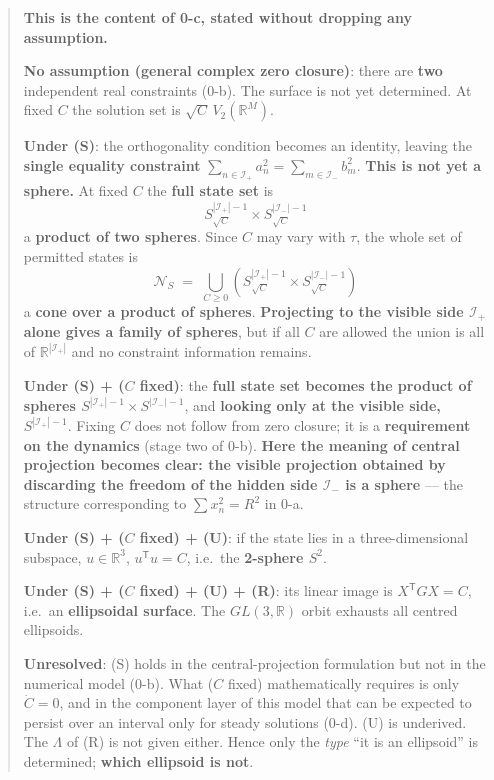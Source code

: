 \documentclass[
  10pt,
]{article}
\begin{document}
\begin{quote}
\textbf{This is the content of 0-c, stated without dropping any
assumption.}

\textbf{No assumption (general complex zero closure)}: there are
\textbf{two} independent real constraints (0-b). The surface is not yet
determined. At fixed \(C\) the solution set is
\(\sqrt{C}\,V_2(\mathbb{R}^M)\).

\textbf{Under (S)}: the orthogonality condition becomes an identity,
leaving the \textbf{single equality constraint}
\(\sum_{n\in \mathcal{I}_+}a_n^2 = \sum_{m\in \mathcal{I}_-}b_m^2\).
\textbf{This is not yet a sphere.} At fixed \(C\) the \textbf{full state
set} is
\[S^{|\mathcal{I}_+|-1}_{\sqrt{C}} \times S^{|\mathcal{I}_-|-1}_{\sqrt{C}}\]
a \textbf{product of two spheres}. Since \(C\) may vary with \(\tau\),
the whole set of permitted states is
\[\mathcal{N}_S \;=\; \bigcup_{C \ge 0}\left(S^{|\mathcal{I}_+|-1}_{\sqrt{C}} \times S^{|\mathcal{I}_-|-1}_{\sqrt{C}}\right)\]
a \textbf{cone over a product of spheres}. \textbf{Projecting to the
visible side \(\mathcal{I}_+\) alone gives a family of spheres}, but if
all \(C\) are allowed the union is all of
\(\mathbb{R}^{|\mathcal{I}_+|}\) and no constraint information remains.

\textbf{Under (S) + (\(C\) fixed)}: the \textbf{full state set becomes
the product of spheres
\(S^{|\mathcal{I}_+|-1}\times S^{|\mathcal{I}_-|-1}\)}, and
\textbf{looking only at the visible side, \(S^{|\mathcal{I}_+|-1}\)}.
Fixing \(C\) does not follow from zero closure; it is a
\textbf{requirement on the dynamics} (stage two of 0-b). \textbf{Here
the meaning of central projection becomes clear: the visible projection
obtained by discarding the freedom of the hidden side \(\mathcal{I}_-\)
is a sphere} --- the structure corresponding to \(\sum x_n^2 = R^2\) in
0-a.

\textbf{Under (S) + (\(C\) fixed) + (U)}: if the state lies in a
three-dimensional subspace, \(u \in \mathbb{R}^3\),
\(u^{\mathsf T}u = C\), i.e.~the \textbf{2-sphere \(S^2\)}.

\textbf{Under (S) + (\(C\) fixed) + (U) + (R)}: its linear image is
\(X^{\mathsf T}GX = C\), i.e.~an \textbf{ellipsoidal surface}. The
\(GL(3,\mathbb{R})\) orbit exhausts all centred ellipsoids.

\textbf{Unresolved}: (S) holds in the central-projection formulation but
not in the numerical model (0-b). What (\(C\) fixed) mathematically
requires is only \(\dot C=0\), and in the component layer of this model
that can be expected to persist over an interval only for steady
solutions (0-d). (U) is underived. The \(\Lambda\) of (R) is not given
either. Hence only the \emph{type} ``it is an ellipsoid'' is determined;
\textbf{which ellipsoid is not}.
\end{quote}
\end{document}
